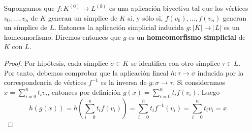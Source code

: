 \begin{lema}
	\label{lem:homeo_complex} Supongamos que $f:K^{(0)}\rightarrow L^{(0)}$ es una
	aplicación biyectiva tal que los vértices $v_{0}, \dots, v_{n}$ de $K$ generan
	un símplice de $K$ si, y sólo si, $f(v_{0}), \dots, f(v_{n})$ generan un símplice
	de $L$. Entonces la aplicación simplicial inducida $g:|K| \rightarrow |L|$ es
	un homeomorfismo. Diremos entonces que $g$ es un \textbf{homeomorfismo
		simplicial} de $K$ con $L$.
\end{lema}

\begin{proof}
	Por hipótesis, cada símplice $\sigma \in K$ se identifica con otro símplice
	$\tau \in L$. Por tanto, debemos comprobar que la aplicación lineal
	$h: \tau \rightarrow \sigma$ inducida por la correspondencia de vértices
	$f^{-1}$ es la inversa de $g: \sigma \rightarrow \tau$. Si consideramos $x = \sum
	_{i=0}^{n}t_{i} v_{i}$, entonces por definición
	$g(x) = \sum_{i=0}^{n}t_{i}f(v_{i})$. Luego
	\[
	h(g(x)) = h(\sum_{i=0}^{n}t_{i}f(v_{i})) = \sum_{i=0}^{n}t_{i} f^{-1}(v_{i})
	= \sum_{i=0}^{n}t_{i} v_{i} = x
	\]
\end{proof}

